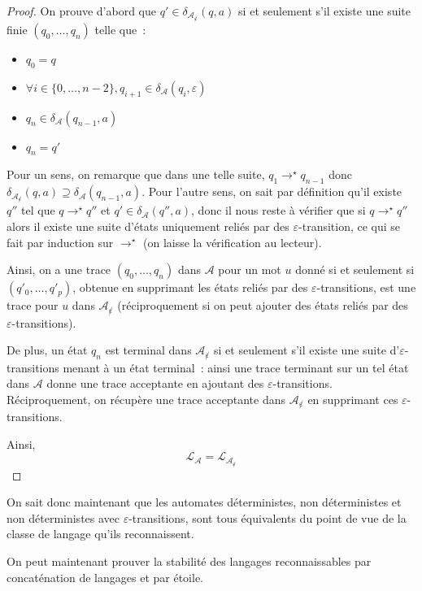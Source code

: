 \begin{proof}
  On prouve d'abord que $q'\in \delta_{\mathcal A_{\not\varepsilon}}(q,a)$ si et
  seulement s'il existe une suite finie $(q_0,\ldots,q_n)$ telle que~:
  \begin{itemize}
  \item $q_0 = q$
  \item $\forall i \in \{0,\ldots,n-2\}, q_{i+1} \in
    \delta_{\mathcal A}(q_i,\varepsilon)$
  \item $q_n \in \delta_{\mathcal A}(q_{n-1},a)$
  \item $q_n = q'$
  \end{itemize}
  Pour un sens, on remarque que dans une telle suite, $q_1 \to^\star q_{n-1}$
  donc $\delta_{\mathcal A_{\not\varepsilon}}(q,a)\supseteq \delta_\mathcal A(q_{n-1},a)$.
  Pour l'autre sens, on sait par définition qu'il existe $q''$ tel que
  $q\to^\star q''$ et $q'\in\delta_\mathcal A (q'',a)$, donc il nous reste à
  vérifier que si $q\to^\star q''$ alors il existe une suite d'états uniquement
  reliés par des $\varepsilon$-transition, ce qui se fait par induction sur
  $\to^\star$ (on laisse la vérification au lecteur).

  Ainsi, on a une trace $(q_0,\ldots,q_n)$ dans $\mathcal A$ pour un mot $u$
  donné si et seulement si $(q'_0,\ldots,q'_p)$, obtenue en supprimant les
  états reliés par des $\varepsilon$-transitions, est une trace pour $u$ dans
  $\mathcal A_{\not\varepsilon}$ (réciproquement si on peut ajouter des états
  reliés par des $\varepsilon$-transitions).

  De plus, un état $q_n$ est terminal dans $\mathcal A_{\not\varepsilon}$ si et
  seulement s'il existe une suite d'$\varepsilon$-transitions menant à un état
  terminal~: ainsi une trace terminant sur un tel état dans $\mathcal A$ donne
  une trace acceptante en ajoutant des $\varepsilon$-transitions.
  Réciproquement, on récupère une trace acceptante dans
  $\mathcal A_{\not\varepsilon}$ en supprimant ces $\varepsilon$-transitions.

  Ainsi,
  \[\mathcal L_{\mathcal A} = \mathcal L_{\mathcal A_{\not\varepsilon}}\]
\end{proof}

On sait donc maintenant que les automates déterministes, non déterministes et
non déterministes avec $\varepsilon$-transitions, sont tous équivalents du
point de vue de la classe de langage qu'ils reconnaissent.

On peut maintenant prouver la stabilité des langages reconnaissables par
concaténation de langages et par étoile.

